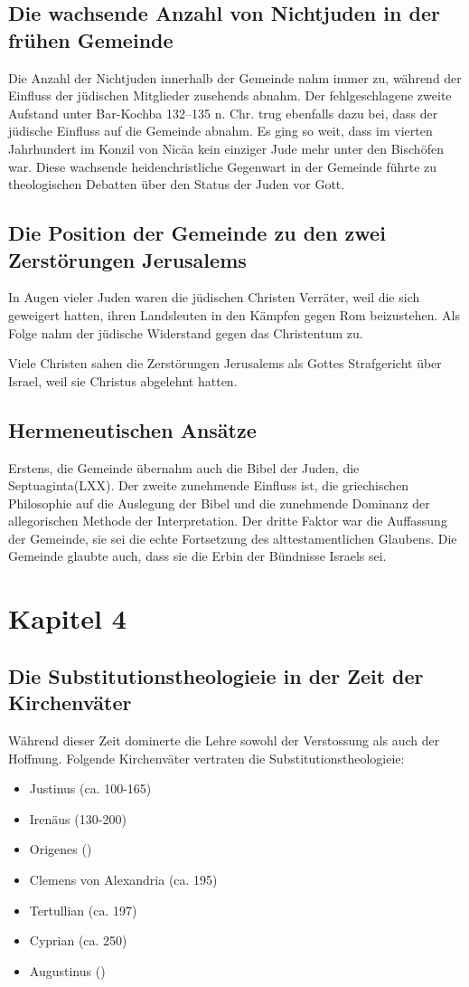 \documentclass[fontsize=14pt]{../../inc/mybib}
\newcommand{\sts}{Substitutionstheologie}
\begin{document}
    \subsection{Die wachsende Anzahl von Nichtjuden in der frühen Gemeinde}
    Die Anzahl der Nichtjuden innerhalb der Gemeinde nahm immer zu, während der Einfluss der jüdischen Mitglieder zusehends abnahm. Der fehlgeschlagene zweite Aufstand unter Bar-Kochba 132--135 n. Chr. trug ebenfalls dazu bei, dass der jüdische Einfluss auf die Gemeinde abnahm. Es ging so weit, dass im vierten Jahrhundert im Konzil von Nicäa kein einziger Jude mehr unter den Bischöfen war. Diese wachsende heidenchristliche Gegenwart in der Gemeinde führte zu theologischen Debatten über den Status der Juden vor Gott.
    \subsection{Die Position der Gemeinde zu den zwei Zerstörungen Jerusalems}
    In Augen vieler Juden waren die jüdischen Christen Verräter, weil die sich geweigert hatten, ihren Landsleuten in den Kämpfen gegen Rom beizustehen. Als Folge nahm der jüdische Widerstand gegen das Christentum zu.

    Viele Christen sahen die Zerstörungen Jerusalems als Gottes Strafgericht über Israel, weil sie Christus abgelehnt hatten.
    \subsection{Hermeneutischen Ansätze}
    Erstens, die Gemeinde übernahm auch die Bibel der Juden, die Septuaginta(LXX). Der zweite zunehmende Einfluss
    ist, die griechischen Philosophie auf die Auslegung der Bibel und die zunehmende Dominanz der allegorischen Methode der Interpretation. Der dritte Faktor war die Auffassung der Gemeinde, sie sei die echte Fortsetzung des alttestamentlichen Glaubens. Die Gemeinde glaubte auch, dass sie die Erbin der Bündnisse Israels sei.
    \section{Kapitel 4}
    \subsection{Die \sts ie in der Zeit der Kirchenväter}
    Während dieser Zeit dominerte die Lehre sowohl der Verstossung als auch der Hoffnung.
    Folgende Kirchenväter vertraten die \sts ie:
    \begin{itemize}
        \item Justinus (ca. 100-165)
        \item Irenäus (130-200)
        \item Origenes ()
        \item Clemens von Alexandria (ca. 195)
        \item Tertullian (ca. 197)
        \item Cyprian (ca. 250)
        \item Augustinus ()
    \end{itemize}
    
\end{document}
